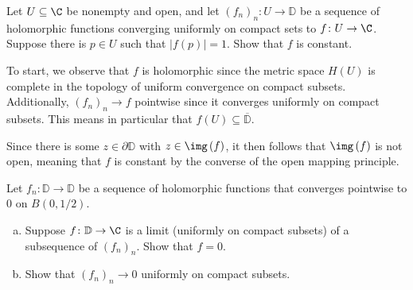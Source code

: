 \documentclass[10pt]{mypackage}
\renewcommand{\D}{\mathbb{D}}
\begin{document}
\begin{problem}[Problem 4]
  Let $U\subseteq \C$ be nonempty and open, and let $\left( f_n \right)_n\colon U\rightarrow \D$ be a sequence of holomorphic functions converging uniformly on compact sets to $f\colon U\rightarrow \C$. Suppose there is $p\in U$ such that $\left\vert f(p) \right\vert = 1$. Show that $f$ is constant.
\end{problem}
\begin{solution}
  To start, we observe that $f$ is holomorphic since the metric space $H(U)$ is complete in the topology of uniform convergence on compact subsets. Additionally, $\left( f_n \right)_n\rightarrow f$ pointwise since it converges uniformly on compact subsets. This means in particular that $f\left( U \right)\subseteq \overline{\D}$.%

  Since there is some $z\in \partial \D$ with $z\in \img\left( f \right)$, it then follows that $\img\left( f \right)$ is not open, meaning that $f$ is constant by the converse of the open mapping principle.
\end{solution}
\begin{problem}[Problem 5]
  Let $f_n\colon \D\rightarrow \D$ be a sequence of holomorphic functions that converges pointwise to $0$ on $B\left( 0,1/2 \right)$.
  \begin{enumerate}[(a)]
    \item Suppose $f\colon \D\rightarrow \C$ is a limit (uniformly on compact subsets) of a subsequence of $\left( f_n \right)_n$. Show that $f = 0$.
    \item Show that $\left( f_n \right)_n\rightarrow 0$ uniformly on compact subsets.
  \end{enumerate}
\end{problem}
\end{document}
